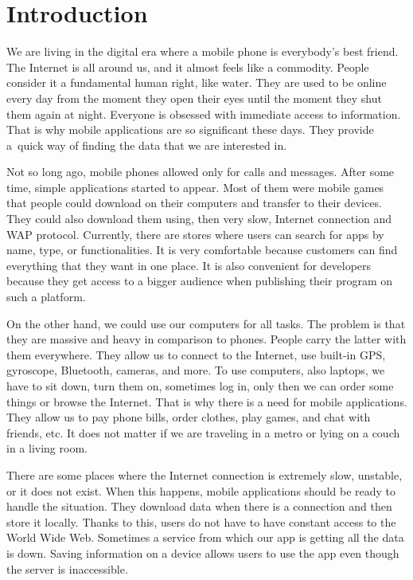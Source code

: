 \chapter{Introduction}
We are living in the digital era where a mobile phone is everybody's best friend. The Internet is all around us, and it almost feels like a commodity. People consider it a fundamental human right, like water. They are used to be online every day from the moment they open their eyes until the moment they shut them again at night. Everyone is obsessed with immediate access to information. That is why mobile applications are so significant these days. They provide a~quick way of finding the data that we are interested in. 

Not so long ago, mobile phones allowed only for calls and messages. After some time, simple applications started to appear. Most of them were mobile games that people could download on their computers and transfer to their devices. They could also download them using, then very slow, Internet connection and WAP protocol. Currently, there are stores where users can search for apps by name, type, or functionalities. It is very comfortable because customers can find everything that they want in one place. It is also convenient for developers because they get access to a bigger audience when publishing their program on such a platform.

On the other hand, we could use our computers for all tasks. The problem is that they are massive and heavy in comparison to phones. People carry the latter with them everywhere. They allow us to connect to the Internet, use built-in GPS, gyroscope, Bluetooth, cameras, and more. To use computers, also laptops, we have to sit down, turn them on, sometimes log in, only then we can order some things or browse the Internet. That is why there is a need for mobile applications. They allow us to pay phone bills, order clothes, play games, and chat with friends, etc. It does not matter if we are traveling in a metro or lying on a couch in a living room.

There are some places where the Internet connection is extremely slow, unstable, or it does not exist. When this happens, mobile applications should be ready to handle the situation. They download data when there is a connection and then store it locally. Thanks to this, users do not have to have constant access to the World Wide Web. Sometimes a service from which our app is getting all the data is down. Saving information on a device allows users to use the app even though the server is inaccessible.


